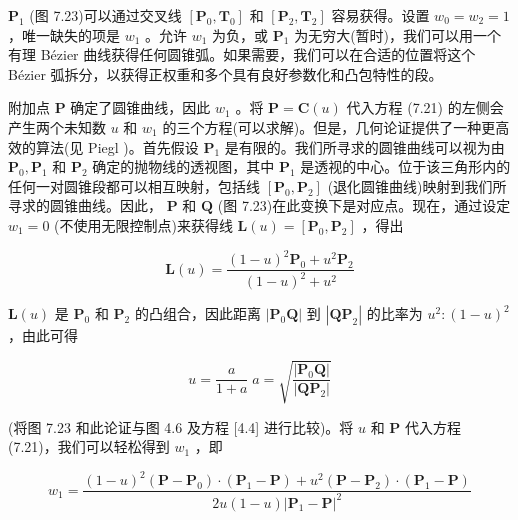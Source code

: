 \documentclass[../main.tex]{subfiles}
\begin{document}
\({\mathbf{P}}_{1}\) (图 7.23)可以通过交叉线 \(\left\lbrack  {{\mathbf{P}}_{0},{\mathbf{T}}_{0}}\right\rbrack\) 和 \(\left\lbrack  {{\mathbf{P}}_{2},{\mathbf{T}}_{2}}\right\rbrack\) 容易获得。设置 \({w}_{0} = {w}_{2} = 1\) ，唯一缺失的项是 \({w}_{1}\) 。允许 \({w}_{1}\) 为负，或 \({\mathbf{P}}_{1}\) 为无穷大(暂时)，我们可以用一个有理 Bézier 曲线获得任何圆锥弧。如果需要，我们可以在合适的位置将这个 Bézier 弧拆分，以获得正权重和多个具有良好参数化和凸包特性的段。

附加点 \(\mathbf{P}\) 确定了圆锥曲线，因此 \({w}_{1}\) 。将 \(\mathbf{P} = \mathbf{C}\left( u\right)\) 代入方程 (7.21) 的左侧会产生两个未知数 \(u\) 和 \({w}_{1}\) 的三个方程(可以求解)。但是，几何论证提供了一种更高效的算法(见 Piegl \cite{Pieg87b})。首先假设 \({\mathbf{P}}_{1}\) 是有限的。我们所寻求的圆锥曲线可以视为由 \({\mathbf{P}}_{0},{\mathbf{P}}_{1}\) 和 \({\mathbf{P}}_{2}\) 确定的抛物线的透视图，其中 \({\mathbf{P}}_{1}\) 是透视的中心。位于该三角形内的任何一对圆锥段都可以相互映射，包括线 \(\left\lbrack  {{\mathbf{P}}_{0},{\mathbf{P}}_{2}}\right\rbrack\) (退化圆锥曲线)映射到我们所寻求的圆锥曲线。因此， \(\mathbf{P}\) 和 \(\mathbf{Q}\) (图 7.23)在此变换下是对应点。现在，通过设定 \({w}_{1} = 0\) (不使用无限控制点)来获得线 \(\mathbf{L}\left( u\right)  = \left\lbrack  {{\mathbf{P}}_{0},{\mathbf{P}}_{2}}\right\rbrack\) ，得出

\[
\mathbf{L}\left( u\right)  = \frac{{\left( 1 - u\right) }^{2}{\mathbf{P}}_{0} + {u}^{2}{\mathbf{P}}_{2}}{{\left( 1 - u\right) }^{2} + {u}^{2}} \tag{7.37}
\]

\(\mathbf{L}\left( u\right)\) 是 \({\mathbf{P}}_{0}\) 和 \({\mathbf{P}}_{2}\) 的凸组合，因此距离 \(\left| {{\mathbf{P}}_{0}\mathbf{Q}}\right|\) 到 \(\left| {\mathbf{{QP}}}_{2}\right|\) 的比率为 \({u}^{2} : {\left( 1 - u\right) }^{2}\) ，由此可得

\[
u = \frac{a}{1 + a}\;a = \sqrt{\frac{\left| {\mathbf{P}}_{0}\mathbf{Q}\right| }{\left| \mathbf{Q}{\mathbf{P}}_{2}\right| }} \tag{7.38}
\]

(将图 7.23 和此论证与图 4.6 及方程 [4.4] 进行比较)。将 \(u\) 和 \(\mathbf{P}\) 代入方程 (7.21)，我们可以轻松得到 \({w}_{1}\) ，即

\[
{w}_{1} = \frac{{\left( 1 - u\right) }^{2}\left( {\mathbf{P} - {\mathbf{P}}_{0}}\right)  \cdot  \left( {{\mathbf{P}}_{1} - \mathbf{P}}\right)  + {u}^{2}\left( {\mathbf{P} - {\mathbf{P}}_{2}}\right)  \cdot  \left( {{\mathbf{P}}_{1} - \mathbf{P}}\right) }{{2u}\left( {1 - u}\right) {\left| {\mathbf{P}}_{1} - \mathbf{P}\right| }^{2}} \tag{7.39}
\]
\end{document}
